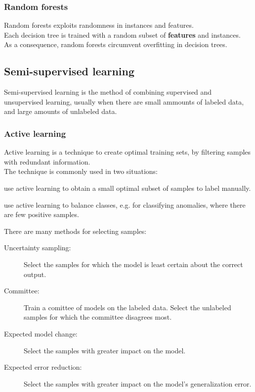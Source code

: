 \documentclass[11pt]{article}
\begin{document}
\subsubsection{Random forests}
\label{sec:orgfcf335b}
Random forests exploits randomness in instances and features. \\
Each decision tree is trained with a random subset of \textbf{features} and instances. \\
As a consequence, random forests circumvent overfitting in decision trees.
\subsection{Semi-supervised learning}
\label{sec:orge83a372}
Semi-supervised learning is the method of combining supervised and unsupervised
learning, usually when there are small ammounts of labeled data, and large amounts of
unlabeled data.
\subsubsection{Active learning}
\label{sec:org28ed2ce}
Active learning is a technique to create optimal training sets, by filtering samples
with redundant information. \\

The technique is commonly used in two situations:
\begin{description}[itemsep=0pt]
\item[{Semi-supervised:}] use active learning to obtain a small optimal subset of samples
to label manually.
\item[{Supervised:}] use active learning to balance classes, e.g. for classifying
anomalies, where there are few positive samples.
\end{description}
\vspace{5px}  There are many methods for selecting samples:
\begin{description}
\item[{Uncertainty sampling:}] Select the samples for which the model is least certain
about the correct output.
\item[{Committee:}] Train a comittee of models on the labeled data. Select the unlabeled
samples for which the committee disagrees most.
\item[{Expected model change:}] Select the samples with greater impact on the model.
\item[{Expected error reduction:}] Select the samples with greater impact on the model's
generalization error.
\end{description}
\end{document}
